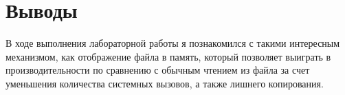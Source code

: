 \documentclass[a4paper, 12pt]{article}
\begin{document}
\section{Выводы}

В ходе выполнения лабораторной работы я познакомился с такими интересным механизмом, как отображение файла в память, который позволяет выиграть в производительности по сравнению с обычным чтением из файла за счет уменьшения количества системных вызовов, а также лишнего копирования.
\end{document}
